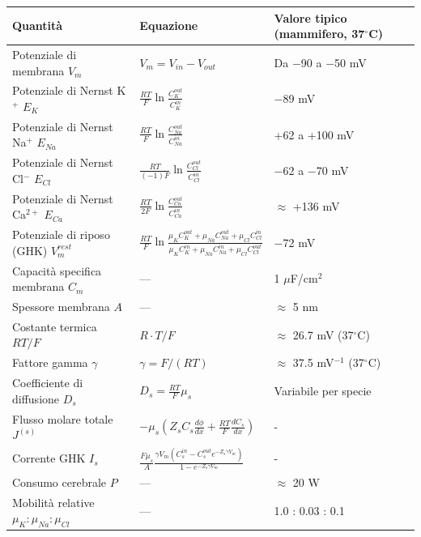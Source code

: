\begin{table}[htbp]
    \centering
    \footnotesize
    \renewcommand{\arraystretch}{1.3}
    \begin{tabularx}{\textwidth}{|l|X|X|}
    \hline
    \textbf{Quantità}  &  \textbf{Equazione} & \textbf{Valore tipico (mammifero, 37$^\circ$C)} \\
    \hline
    Potenziale di membrana  $V_m$  & $V_m = V_{in} - V_{out}$ & Da $-$90 a $-$50 mV \\
    \hline
    Potenziale di Nernst K$^+$  $E_K$ & $\frac{RT}{F}\ln\frac{C_K^{out}}{C_K^{in}}$ & $-$89 mV \\
    \hline
    Potenziale di Nernst Na$^+$  $E_{Na}$  & $\frac{RT}{F}\ln\frac{C_{Na}^{out}}{C_{Na}^{in}}$ & +62 a +100 mV \\
    \hline
    Potenziale di Nernst Cl$^-$  $E_{Cl}$ & $\frac{RT}{(-1)F}\ln\frac{C_{Cl}^{out}}{C_{Cl}^{in}}$ & $-$62 a $-$70 mV \\
    \hline
    Potenziale di Nernst Ca$^{2+}$  $E_{Ca}$ & $\frac{RT}{2F}\ln\frac{C_{Ca}^{out}}{C_{Ca}^{in}}$ & $\approx$ +136 mV \\
    \hline
    Potenziale di riposo (GHK)  $V_m^{rest}$  & $\frac{RT}{F}\ln\frac{\mu_K C_K^{out}+\mu_{Na} C_{Na}^{out}+\mu_{Cl} C_{Cl}^{in}}{\mu_K C_K^{in}+\mu_{Na} C_{Na}^{in}+\mu_{Cl} C_{Cl}^{out}}$ & $-$72 mV \\
    \hline
    Capacità specifica membrana  $C_m$  & — & 1 $\mu$F/cm$^2$ \\
    \hline
    Spessore membrana  $A$  & — & $\approx$ 5 nm \\
    \hline
    Costante termica  $RT/F$  & $R \cdot T / F$ & $\approx$ 26.7 mV (37$^\circ$C) \\
    \hline
    Fattore gamma  $\gamma$ & $\gamma = F/(RT)$ & $\approx$ 37.5 mV$^{-1}$ (37$^\circ$C) \\
    \hline
    Coefficiente di diffusione  $D_s$ &  $D_s = \frac{RT}{F}\mu_s$ & Variabile per specie \\
    \hline
    Flusso molare totale  $J^{(s)}$ & $-\mu_s\left(Z_s C_s \frac{d\phi}{dx}+\frac{RT}{F}\frac{dC_s}{dx}\right)$ & - \\
    \hline
    Corrente GHK  $I_s$ & $\frac{F\mu_s}{A}\frac{\gamma V_m(C_s^{in}-C_s^{out}e^{-Z_s\gamma V_m})}{1-e^{-Z_s\gamma V_m}}$ & - \\
    \hline
    
    Consumo cerebrale  $P$ & — & $\approx$ 20 W \\
    \hline
    Mobilità relative  $\mu_K:\mu_{Na}:\mu_{Cl}$ & — & 1.0 : 0.03 : 0.1 \\
    \hline
    \end{tabularx}
\end{table}

